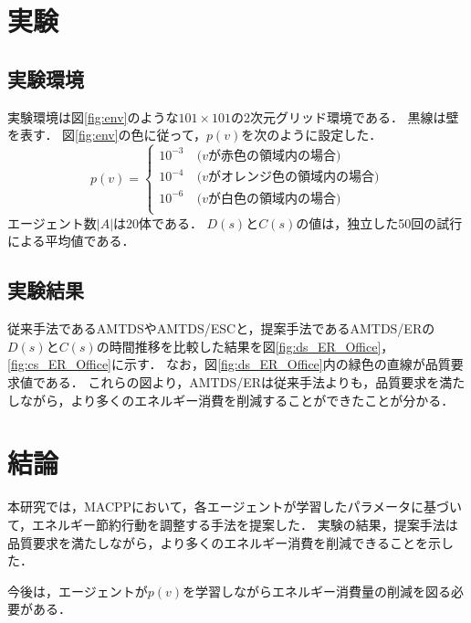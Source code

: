 \documentclass[11pt,a4j,twocolumn]{jarticle}
\begin{document}
\section{実験}
\subsection{実験環境}
  実験環境は図\ref{fig:env}のような$101 \times 101$の2次元グリッド環境である．
  黒線は壁を表す．
  図\ref{fig:env}の色に従って，$p(v)$を次のように設定した．
  \[
    p(v) = 
    \begin{cases}
      10^{-3}\ & \textrm{($v$が赤色の領域内の場合)}\\
      10^{-4}\ & \textrm{($v$がオレンジ色の領域内の場合)}\\
      10^{-6}\ & \textrm{($v$が白色の領域内の場合)}\\
    \end{cases}
  \]
  エージェント数$|A|$は20体である．
  $D(s)$と$C(s)$の値は，独立した50回の試行による平均値である．

  \subsection{実験結果}
  従来手法であるAMTDSやAMTDS/ESCと，提案手法であるAMTDS/ERの$D(s)$と$C(s)$の時間推移を比較した結果を図\ref{fig:ds_ER_Office}，\ref{fig:cs_ER_Office}に示す．
  なお，図\ref{fig:ds_ER_Office}内の緑色の直線が品質要求値である．
  これらの図より，AMTDS/ERは従来手法よりも，品質要求を満たしながら，より多くのエネルギー消費を削減することができたことが分かる．

\section{結論}
本研究では，MACPPにおいて，各エージェントが学習したパラメータに基づいて，エネルギー節約行動を調整する手法を提案した．
実験の結果，提案手法は品質要求を満たしながら，より多くのエネルギー消費を削減できることを示した．
\par

今後は，エージェントが$p(v)$を学習しながらエネルギー消費量の削減を図る必要がある．



\end{document}
